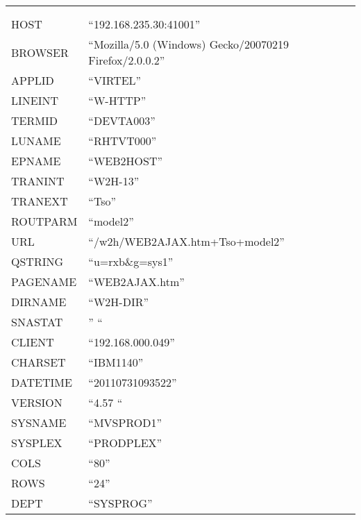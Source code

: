 \documentclass[letterpaper,10pt,english]{sphinxmanual}
\begin{document}
\begin{savenotes}\sphinxattablestart
\centering
\begin{tabulary}{\linewidth}[t]{|T|T|}
\hline
{}%
&%
\\
&\\
\hline
HOST
&
“192.168.235.30:41001”
\\
\hline
BROWSER
&
“Mozilla/5.0 (Windows) Gecko/20070219 Firefox/2.0.0.2”
\\
\hline
APPLID
&
“VIRTEL”
\\
\hline
LINEINT
&
“W-HTTP”
\\
\hline
TERMID
&
“DEVTA003”
\\
\hline
LUNAME
&
“RHTVT000”
\\
\hline
EPNAME
&
“WEB2HOST”
\\
\hline
TRANINT
&
“W2H-13”
\\
\hline
TRANEXT
&
“Tso”
\\
\hline
ROUTPARM
&
“model2”
\\
\hline
URL
&
“/w2h/WEB2AJAX.htm+Tso+model2”
\\
\hline
QSTRING
&
“u=rxb\&g=sys1”
\\
\hline
PAGENAME
&
“WEB2AJAX.htm”
\\
\hline
DIRNAME
&
“W2H-DIR”
\\
\hline
SNASTAT
&
” “
\\
\hline
CLIENT
&
“192.168.000.049”
\\
\hline
CHARSET
&
“IBM1140”
\\
\hline
DATETIME
&
“20110731093522”
\\
\hline
VERSION
&
“4.57 “
\\
\hline
SYSNAME
&
“MVSPROD1”
\\
\hline
SYSPLEX
&
“PRODPLEX”
\\
\hline
COLS
&
“80”
\\
\hline
ROWS
&
“24”
\\
\hline
DEPT
&
“SYSPROG”
\\
\hline
\end{tabulary}
\par
\sphinxattableend\end{savenotes}
\end{document}

